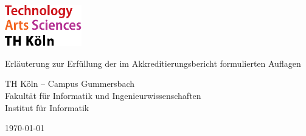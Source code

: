 
\begin{titlepage}

	\includegraphics[width=0.25\textwidth]{../../../assets/logo_th_koeln.pdf}

	\vspace{2cm}
	{\Large\raggedright Erläuterung zur Erfüllung der im Akkreditierungsbericht formulierten Auflagen\par}
	\vspace{1cm}
	{\Large TH Köln – Campus Gummersbach \\ Fakultät für Informatik und Ingenieurwissenschaften \\ Institut für Informatik\par}

	\vfill

	{\large \today\par}
\end{titlepage}
